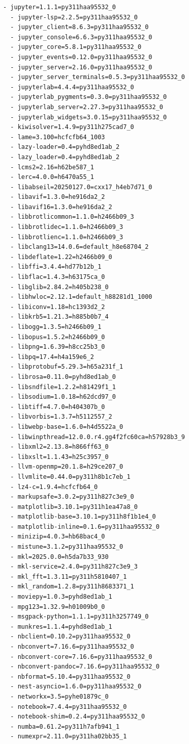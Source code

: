 \documentclass[11pt,a4paper]{article}
\begin{document}
\begin{lstlisting}[caption=Environment/Requirements file]
  - jupyter=1.1.1=py311haa95532_0
  - jupyter-lsp=2.2.5=py311haa95532_0
  - jupyter_client=8.6.3=py311haa95532_0
  - jupyter_console=6.6.3=py311haa95532_0
  - jupyter_core=5.8.1=py311haa95532_0
  - jupyter_events=0.12.0=py311haa95532_0
  - jupyter_server=2.16.0=py311haa95532_0
  - jupyter_server_terminals=0.5.3=py311haa95532_0
  - jupyterlab=4.4.4=py311haa95532_0
  - jupyterlab_pygments=0.3.0=py311haa95532_0
  - jupyterlab_server=2.27.3=py311haa95532_0
  - jupyterlab_widgets=3.0.15=py311haa95532_0
  - kiwisolver=1.4.9=py311h275cad7_0
  - lame=3.100=hcfcfb64_1003
  - lazy-loader=0.4=pyhd8ed1ab_2
  - lazy_loader=0.4=pyhd8ed1ab_2
  - lcms2=2.16=h62be587_1
  - lerc=4.0.0=h6470a55_1
  - libabseil=20250127.0=cxx17_h4eb7d71_0
  - libavif=1.3.0=he916da2_2
  - libavif16=1.3.0=he916da2_2
  - libbrotlicommon=1.1.0=h2466b09_3
  - libbrotlidec=1.1.0=h2466b09_3
  - libbrotlienc=1.1.0=h2466b09_3
  - libclang13=14.0.6=default_h8e68704_2
  - libdeflate=1.22=h2466b09_0
  - libffi=3.4.4=hd77b12b_1
  - libflac=1.4.3=h63175ca_0
  - libglib=2.84.2=h405b238_0
  - libhwloc=2.12.1=default_h88281d1_1000
  - libiconv=1.18=hc1393d2_2
  - libkrb5=1.21.3=h885b0b7_4
  - libogg=1.3.5=h2466b09_1
  - libopus=1.5.2=h2466b09_0
  - libpng=1.6.39=h8cc25b3_0
  - libpq=17.4=h4a159e6_2
  - libprotobuf=5.29.3=h65a231f_1
  - librosa=0.11.0=pyhd8ed1ab_0
  - libsndfile=1.2.2=h81429f1_1
  - libsodium=1.0.18=h62dcd97_0
  - libtiff=4.7.0=h404307b_0
  - libvorbis=1.3.7=h5112557_2
  - libwebp-base=1.6.0=h4d5522a_0
  - libwinpthread=12.0.0.r4.gg4f2fc60ca=h57928b3_9
  - libxml2=2.13.8=h866ff63_0
  - libxslt=1.1.43=h25c3957_0
  - llvm-openmp=20.1.8=h29ce207_0
  - llvmlite=0.44.0=py311h8b1c7eb_1
  - lz4-c=1.9.4=hcfcfb64_0
  - markupsafe=3.0.2=py311h827c3e9_0
  - matplotlib=3.10.1=py311h1ea47a8_0
  - matplotlib-base=3.10.1=py311h8f1b1e4_0
  - matplotlib-inline=0.1.6=py311haa95532_0
  - minizip=4.0.3=hb68bac4_0
  - mistune=3.1.2=py311haa95532_0
  - mkl=2025.0.0=h5da7b33_930
  - mkl-service=2.4.0=py311h827c3e9_3
  - mkl_fft=1.3.11=py311h5810407_1
  - mkl_random=1.2.8=py311h8683371_1
  - moviepy=1.0.3=pyhd8ed1ab_1
  - mpg123=1.32.9=h01009b0_0
  - msgpack-python=1.1.1=py311h3257749_0
  - munkres=1.1.4=pyhd8ed1ab_1
  - nbclient=0.10.2=py311haa95532_0
  - nbconvert=7.16.6=py311haa95532_0
  - nbconvert-core=7.16.6=py311haa95532_0
  - nbconvert-pandoc=7.16.6=py311haa95532_0
  - nbformat=5.10.4=py311haa95532_0
  - nest-asyncio=1.6.0=py311haa95532_0
  - networkx=3.5=pyhe01879c_0
  - notebook=7.4.4=py311haa95532_0
  - notebook-shim=0.2.4=py311haa95532_0
  - numba=0.61.2=py311h7afb941_1
  - numexpr=2.11.0=py311ha02bb35_1

\end{lstlisting}
\end{document}
